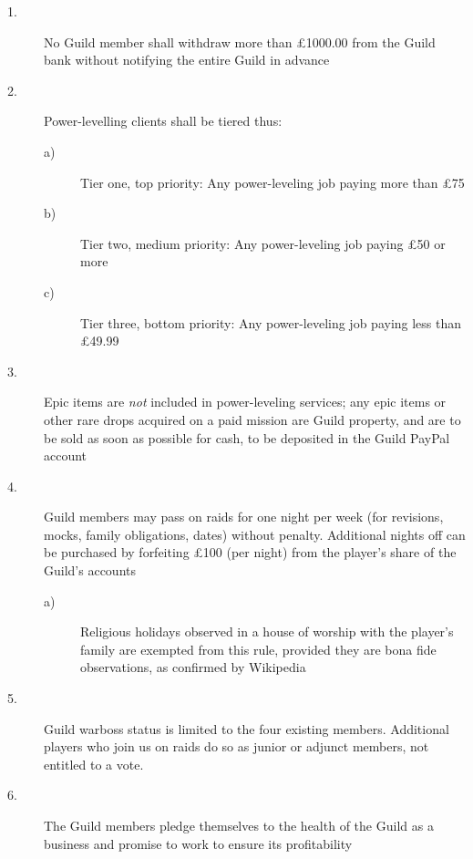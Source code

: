 \begin{description}
\item[1.] No Guild member shall withdraw more than \strangesymbol\pounds1000.00 from the 
Guild bank without notifying the entire Guild in advance

\item[2.] Power-levelling clients shall be tiered thus:

\begin{description}
\item[a)] Tier one, top priority: Any 
power-leveling job paying more than \strangesymbol\pounds75 

\item[b)] Tier two, medium priority: Any 
power-leveling job paying \strangesymbol\pounds50 or more 

\item[c)] Tier three, bottom priority: Any 
power-leveling job paying less than \strangesymbol\pounds49.99 

\end{description}

\item[3.] Epic items are \emph{not} included in power-leveling services; any 
epic items or other rare drops acquired on a paid mission are Guild 
property, and are to be sold as soon as possible for cash, to be 
deposited in the Guild PayPal account

\item[4.] Guild members may pass on raids for one night per week (for 
revisions, mocks, family obligations, dates) without penalty. 
Additional nights off can be purchased by forfeiting \strangesymbol\pounds100 (per 
night) from the player's share of the Guild's accounts

\begin{description}
\item[a)] Religious holidays observed in a house 
of worship with the player's family are exempted from this rule, 
provided they are bona fide observations, as confirmed by Wikipedia 

\end{description}

\item[5.] Guild warboss status is limited to the four existing members. 
Additional players who join us on raids do so as junior or adjunct 
members, not entitled to a vote.

\item[6.] The Guild members pledge themselves to the health of the Guild as a 
business and promise to work to ensure its profitability
\end{description}

